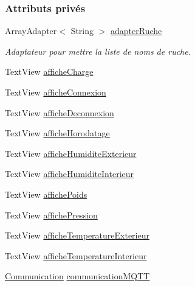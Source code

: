 \subsubsection*{Attributs privés}
\begin{DoxyCompactItemize}
\item 
Array\+Adapter$<$ String $>$ \hyperlink{classcom_1_1example_1_1bee__honeyt_1_1_i_h_m_mobile_afafe74da6dfeae76058bfbf17d4d23b3}{adapter\+Ruche}
\begin{DoxyCompactList}\small\item\em Adaptateur pour mettre la liste de noms de ruche. \end{DoxyCompactList}\item 
Text\+View \hyperlink{classcom_1_1example_1_1bee__honeyt_1_1_i_h_m_mobile_af83151ec51b1f533802cf95057667215}{affiche\+Charge}
\item 
Text\+View \hyperlink{classcom_1_1example_1_1bee__honeyt_1_1_i_h_m_mobile_af2248fbfeeed19f1256db84bf3a4dc94}{affiche\+Connexion}
\item 
Text\+View \hyperlink{classcom_1_1example_1_1bee__honeyt_1_1_i_h_m_mobile_a6387ccc4e8483220e821e9e88f7d3964}{affiche\+Deconnexion}
\item 
Text\+View \hyperlink{classcom_1_1example_1_1bee__honeyt_1_1_i_h_m_mobile_a624f148d43715aa48ba84e749637c2a5}{affiche\+Horodatage}
\item 
Text\+View \hyperlink{classcom_1_1example_1_1bee__honeyt_1_1_i_h_m_mobile_aa75e62918ab5b0322199d3a9919de17b}{affiche\+Humidite\+Exterieur}
\item 
Text\+View \hyperlink{classcom_1_1example_1_1bee__honeyt_1_1_i_h_m_mobile_af061affda51e77bec2c6850b3895dc76}{affiche\+Humidite\+Interieur}
\item 
Text\+View \hyperlink{classcom_1_1example_1_1bee__honeyt_1_1_i_h_m_mobile_a83854ea1a388eb4919c953ef00e8fa7f}{affiche\+Poids}
\item 
Text\+View \hyperlink{classcom_1_1example_1_1bee__honeyt_1_1_i_h_m_mobile_a2bc1237c9f17c51c2f506c31fba5b264}{affiche\+Pression}
\item 
Text\+View \hyperlink{classcom_1_1example_1_1bee__honeyt_1_1_i_h_m_mobile_a102530688eabbb8bfa549291b51a78ba}{affiche\+Temperature\+Exterieur}
\item 
Text\+View \hyperlink{classcom_1_1example_1_1bee__honeyt_1_1_i_h_m_mobile_ac553e3089f95a9fec9ec7345ad3aefcd}{affiche\+Temperature\+Interieur}
\item 
\hyperlink{classcom_1_1example_1_1bee__honeyt_1_1_communication}{Communication} \hyperlink{classcom_1_1example_1_1bee__honeyt_1_1_i_h_m_mobile_a832529dab7bfae5405c5496e971e8c84}{communication\+M\+Q\+TT}

\end{DoxyCompactItemize}
